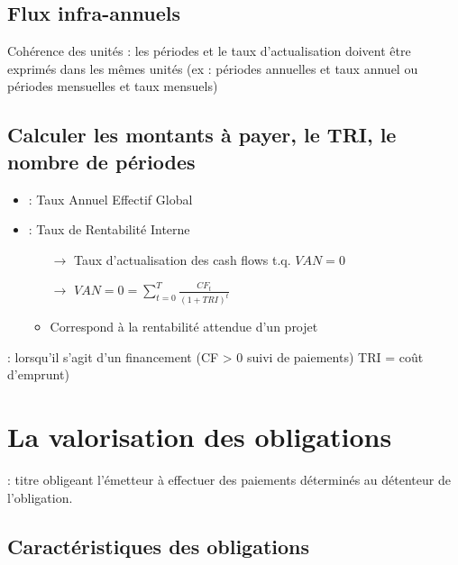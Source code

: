 \section{Flux infra-annuels}

\warning Cohérence des unités : les périodes et le taux d'actualisation doivent être exprimés dans les mêmes unités (ex : périodes annuelles et taux annuel ou périodes mensuelles et taux mensuels)

\section{Calculer les montants à payer, le TRI, le nombre de périodes}

\begin{itemize}
    \item {} : Taux Annuel Effectif Global
    \item {} : Taux de Rentabilité Interne
    \begin{itemize}
        \item[$\rightarrow$] Taux d'actualisation des cash flows t.q. $VAN = 0$
        \item[$\rightarrow$] $VAN = 0 = \sum_{t = 0}^T \frac{CF_t}{(1 + TRI)^t}$
        \item Correspond à la rentabilité attendue d'un projet
    \end{itemize}
\end{itemize}

 : lorsqu'il s'agit d'un financement (CF > 0 suivi de paiements) TRI = coût d’emprunt)

\addtocounter{chapter}{1}
\chapter{La valorisation des obligations}

 : titre obligeant l'émetteur à effectuer des paiements déterminés au détenteur de l'obligation.

\section{Caractéristiques des obligations}

